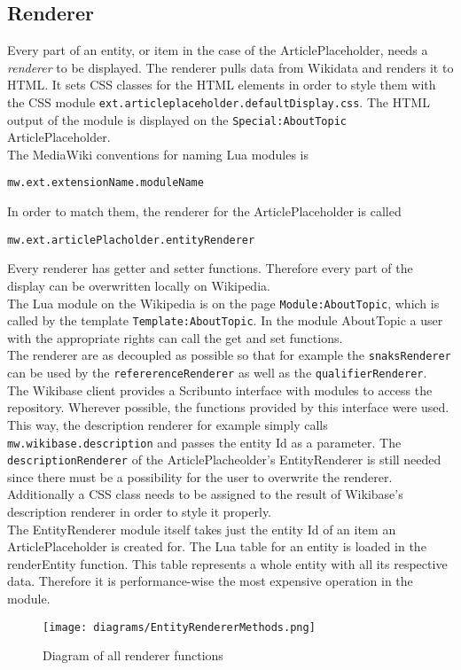 \subsection{Renderer}

Every part of an entity, or item in the case of the ArticlePlaceholder, needs a \textit{renderer} to be displayed. The renderer pulls data from Wikidata and renders it to HTML. It sets CSS classes for the HTML elements in order to style them with the CSS module \texttt{\justify ext.articleplaceholder.defaultDisplay.css}. The HTML output of the module is displayed on the \texttt{\justify Special:AboutTopic} ArticlePlaceholder. \\
The MediaWiki conventions for naming Lua modules is 
\begin{center}
\texttt{\justify mw.ext.extensionName.moduleName} 
\end{center}
In order to match them, the renderer for the ArticlePlaceholder is called 
\begin{center}
\texttt{\justify mw.ext.articlePlacholder.entityRenderer}
\end{center}
Every renderer has getter and setter functions. Therefore every part of the display can be overwritten locally on Wikipedia. \\
The Lua module on the Wikipedia is on the page \texttt{\justify Module:AboutTopic}, which is called by the template \texttt{\justify Template:AboutTopic}. In the module AboutTopic a user with the appropriate rights can call the get and set functions. \\
The renderer are as decoupled as possible so that for example the \texttt{\justify snaksRenderer} can be used by the \texttt{\justify refererenceRenderer} as well as the \texttt{\justify qualifierRenderer}. \\
The Wikibase client provides a Scribunto interface with modules to access the repository. Wherever possible, the functions provided by this interface were used. This way, the description renderer for example simply calls \texttt{\justify mw.wikibase.description} and passes the entity Id as a parameter. The \texttt{\justify descriptionRenderer} of the ArticlePlacheolder's EntityRenderer is still needed since there must be a possibility for the user to overwrite the renderer. Additionally a CSS class needs to be assigned to the result of Wikibase's description renderer in order to style it properly. \\
The EntityRenderer module itself takes just the entity Id of an item an ArticlePlaceholder is created for. The Lua table for an entity is loaded in the renderEntity function. This table represents a whole entity with all its respective data. Therefore it is performance-wise the most expensive operation in the module. \\

\begin{figure}[H]
	\centering
	\texttt{[image: diagrams/EntityRendererMethods.png]}
	\caption{Diagram of all renderer functions}
	\label{fig:renderer}
\end{figure}

